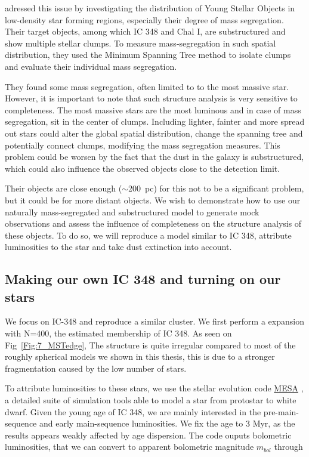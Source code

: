 \cite{Kirk2011} adressed this issue by investigating the distribution of Young Stellar Objects in low-density star forming regions, especially their degree of mass segregation. Their target objects, among which IC 348 and Chal I, are substructured and show multiple stellar clumps. To measure mass-segregation in such spatial distribution, they used the Minimum Spanning Tree method to isolate clumps and evaluate their individual mass segregation.

They found some mass segregation, often limited to to the most massive star. However, it is important to note that such structure analysis is very  sensitive to completeness. The most massive stars are the most luminous and in case of mass segregation, sit in the center of clumps. Including lighter, fainter and more spread out stars could alter the global spatial distribution, change the spanning tree and potentially connect clumps, modifying the mass segregation measures. This problem could be worsen by the fact that the dust in the galaxy is substructured, which could also influence the observed objects close to the detection limit.

Their objects are close enough ($\sim$200~pc) for this not to be a significant problem, but it could be for more distant objects. We wish to  demonstrate how to use our naturally mass-segregated and substructured model to generate mock observations and assess the influence of completeness on the structure analysis of these objects. To do so, we will reproduce a model similar to IC 348, attribute luminosities to the star and take dust extinction into account.


\subsection*{Making our own IC 348 and turning on our stars}


We focus on IC-348 and reproduce a similar cluster. We first perform a \HubLem expansion with N=400, the estimated membership of IC 348. As seen on Fig~\ref{Fig:7_MSTedge}, The structure is quite irregular compared to most of the roughly spherical models we shown in this thesis, this is due to a stronger fragmentation caused by the low number of stars.

To attribute luminosities to these stars, we use the stellar evolution code \href{http://mesa.sourceforge.net/}{MESA} \citep{Paxton2011}, a detailed suite of simulation tools able to model a star from protostar to white dwarf. Given the young age of IC 348, we are mainly interested in the pre-main-sequence and early main-sequence luminosities. We fix the age to 3 Myr, as the results appears weakly affected by age dispersion. The code ouputs bolometric luminosities, that we can convert to apparent bolometric magnitude $m_{bol}$ through

